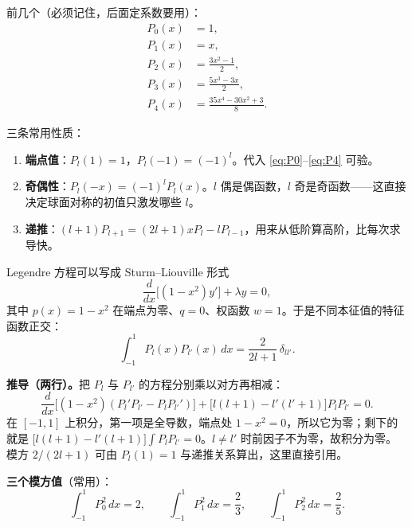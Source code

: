 前几个（必须记住，后面定系数要用）：
\begin{align}
P_0(x)&=1, \label{eq:P0}\\
P_1(x)&=x, \label{eq:P1}\\
P_2(x)&=\frac{3x^2-1}{2}, \label{eq:P2}\\
P_3(x)&=\frac{5x^3-3x}{2}, \label{eq:P3}\\
P_4(x)&=\frac{35x^4-30x^2+3}{8}. \label{eq:P4}
\end{align}

三条常用性质：

\begin{enumerate}[label=\textbf{(\arabic*)}]
  \item \textbf{端点值}：$P_l(1)=1$，$P_l(-1)=(-1)^l$。代入 \eqref{eq:P0}--\eqref{eq:P4} 可验。
  \item \textbf{奇偶性}：$P_l(-x)=(-1)^lP_l(x)$。$l$ 偶是偶函数，$l$ 奇是奇函数——这直接决定球面对称的初值只激发哪些 $l$。
  \item \textbf{递推}：$(l+1)P_{l+1}=(2l+1)xP_l-lP_{l-1}$，用来从低阶算高阶，比每次求导快。
\end{enumerate}



Legendre 方程可以写成 Sturm--Liouville 形式
\[
\frac{d}{dx}\Big[(1-x^2)y'\Big]+\lambda y=0 ,
\]
其中 $p(x)=1-x^2$ 在端点为零、$q=0$、权函数 $w=1$。于是不同本征值的特征函数正交：
\begin{equation}
\int_{-1}^{1}P_l(x)P_{l'}(x)\,dx=\frac{2}{2l+1}\,\delta_{ll'} .
\label{eq:orthP}
\end{equation}

\textbf{推导（两行）。}把 $P_l$ 与 $P_{l'}$ 的方程分别乘以对方再相减：
\[
\frac{d}{dx}\Big[(1-x^2)(P_l'P_{l'}-P_lP_{l'}')\Big]+\big[l(l+1)-l'(l'+1)\big]P_lP_{l'}=0 .
\]
在 $[-1,1]$ 上积分，第一项是全导数，端点处 $1-x^2=0$，所以它为零；剩下的就是
$\big[l(l+1)-l'(l+1)\big]\int P_lP_{l'}=0$。$l\ne l'$ 时前因子不为零，故积分为零。模方 $2/(2l+1)$
可由 $P_l(1)=1$ 与递推关系算出，这里直接引用。

\textbf{三个模方值}（常用）：
\[
\int_{-1}^1P_0^2\,dx=2,\qquad
\int_{-1}^1P_1^2\,dx=\frac23,\qquad
\int_{-1}^1P_2^2\,dx=\frac25 .
\]

